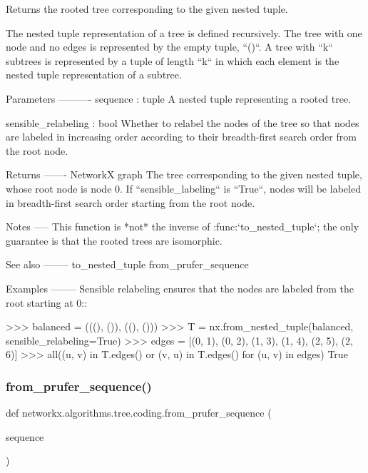 \begin{DoxyVerb}Returns the rooted tree corresponding to the given nested tuple.

The nested tuple representation of a tree is defined
recursively. The tree with one node and no edges is represented by
the empty tuple, ``()``. A tree with ``k`` subtrees is represented
by a tuple of length ``k`` in which each element is the nested tuple
representation of a subtree.

Parameters
----------
sequence : tuple
    A nested tuple representing a rooted tree.

sensible_relabeling : bool
    Whether to relabel the nodes of the tree so that nodes are
    labeled in increasing order according to their breadth-first
    search order from the root node.

Returns
-------
NetworkX graph
    The tree corresponding to the given nested tuple, whose root
    node is node 0. If ``sensible_labeling`` is ``True``, nodes will
    be labeled in breadth-first search order starting from the root
    node.

Notes
-----
This function is *not* the inverse of :func:`to_nested_tuple`; the
only guarantee is that the rooted trees are isomorphic.

See also
--------
to_nested_tuple
from_prufer_sequence

Examples
--------
Sensible relabeling ensures that the nodes are labeled from the root
starting at 0::

    >>> balanced = (((), ()), ((), ()))
    >>> T = nx.from_nested_tuple(balanced, sensible_relabeling=True)
    >>> edges = [(0, 1), (0, 2), (1, 3), (1, 4), (2, 5), (2, 6)]
    >>> all((u, v) in T.edges() or (v, u) in T.edges() for (u, v) in edges)
    True\end{DoxyVerb}
 \mbox{\label{namespacenetworkx_1_1algorithms_1_1tree_1_1coding_a9ab0a5a2689792787678a30ff1cb9ef7}} 
\subsubsection{\texorpdfstring{from\+\_\+prufer\+\_\+sequence()}{from\_prufer\_sequence()}}
{\footnotesize\ttfamily def networkx.\+algorithms.\+tree.\+coding.\+from\+\_\+prufer\+\_\+sequence (\begin{DoxyParamCaption}\item[{}]{sequence }\end{DoxyParamCaption})}

